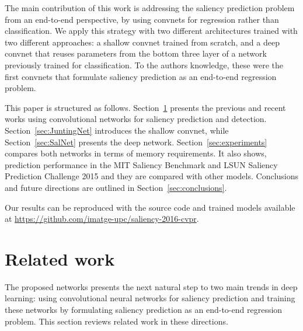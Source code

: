 \documentclass[10pt,twocolumn,letterpaper]{article}
\begin{document}
The main contribution of this work is addressing the saliency prediction problem from an end-to-end perspective, by using convnets for regression rather than classification. 
We apply this strategy with two different architectures trained with two different approaches:
a shallow convnet trained from scratch, and a deep convnet that reuses parameters from the bottom three layer of a network previously trained for classification.
To the authors knowledge, these were the first convnets that formulate saliency prediction as an end-to-end regression problem.


This paper is structured as follows. Section~\ref{sec:RelatedWork} presents the previous and recent works using convolutional networks for saliency prediction and detection.
Section~\ref{sec:JuntingNet} introduces the shallow convnet, while Section~\ref{sec:SalNet} presents the deep network.
Section~\ref{sec:experiments} compares both networks in terms of memory requirements. It also shows, prediction performance in the MIT Saliency Benchmark and LSUN Saliency Prediction Challenge 2015 and they are compared with other models.
Conclusions and future directions are outlined in Section~\ref{sec:conclusions}.

Our results can be reproduced with the source code and trained models available at \url{https://github.com/imatge-upc/saliency-2016-cvpr}.
\section{Related work}\label{sec:RelatedWork}

The proposed networks presents the next natural step to two main trends in deep learning: using convolutional neural networks for saliency prediction and training these networks by formulating saliency prediction as an end-to-end regression problem.
This section reviews related work in these directions.
\end{document}
